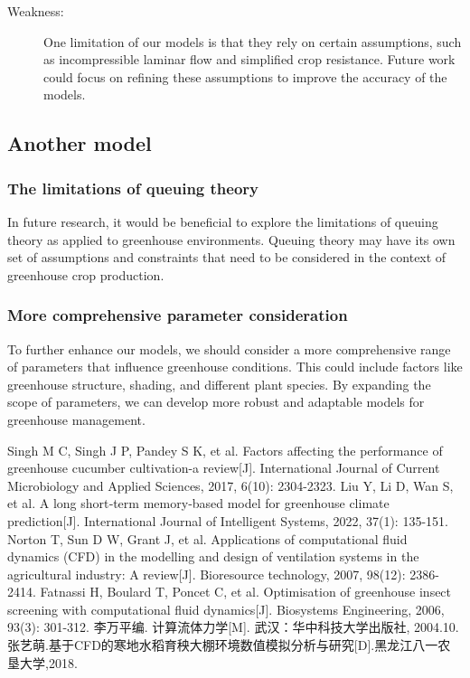 \documentclass{apmcmthesis}
\begin{document}
{\begin{description}
\item[Weakness:] One limitation of our models is that they rely on certain assumptions, such as incompressible laminar flow and simplified crop resistance. Future work could focus on refining these assumptions to improve the accuracy of the models.
\end{description}

\subsection{Another model}
\subsubsection{The limitations of queuing theory}
In future research, it would be beneficial to explore the limitations of queuing theory as applied to greenhouse environments. Queuing theory may have its own set of assumptions and constraints that need to be considered in the context of greenhouse crop production.

\subsubsection{More comprehensive parameter consideration}
To further enhance our models, we should consider a more comprehensive range of parameters that influence greenhouse conditions. This could include factors like greenhouse structure, shading, and different plant species. By expanding the scope of parameters, we can develop more robust and adaptable models for greenhouse management.


\begin{thebibliography}{9}%
  Singh M C, Singh J P, Pandey S K, et al. Factors affecting the performance of greenhouse cucumber cultivation-a review[J]. International Journal of Current Microbiology and Applied Sciences, 2017, 6(10): 2304-2323.
 Liu Y, Li D, Wan S, et al. A long short‐term memory‐based model for greenhouse climate prediction[J]. International Journal of Intelligent Systems, 2022, 37(1): 135-151.
 Norton T, Sun D W, Grant J, et al. Applications of computational fluid dynamics (CFD) in the modelling and design of ventilation systems in the agricultural industry: A review[J]. Bioresource technology, 2007, 98(12): 2386-2414.
 Fatnassi H, Boulard T, Poncet C, et al. Optimisation of greenhouse insect screening with computational fluid dynamics[J]. Biosystems Engineering, 2006, 93(3): 301-312.
 李万平编. 计算流体力学[M]. 武汉：华中科技大学出版社, 2004.10.
 张艺萌.基于CFD的寒地水稻育秧大棚环境数值模拟分析与研究[D].黑龙江八一农垦大学,2018.
\end{thebibliography}


}
\end{document}
